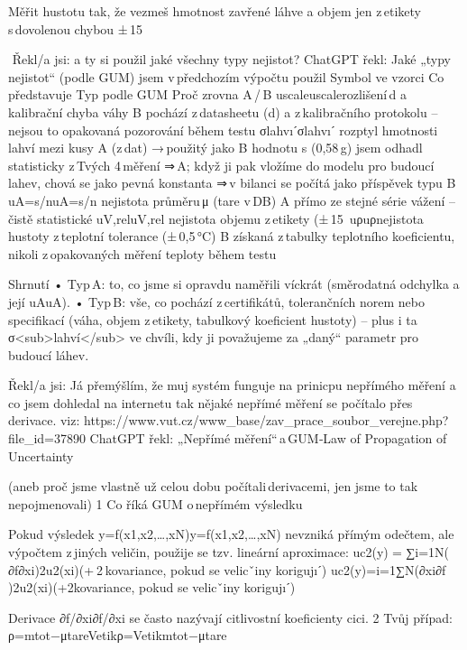 {Měřit hustotu tak, že vezmeš hmotnost zavřené láhve a objem jen z etikety s dovolenou chybou ± 15 %

​
Řekl/a jsi:
a ty si použil jaké všechny typy nejistot?
ChatGPT řekl:
Jaké „typy nejistot“ (podle GUM) jsem v předchozím výpočtu použil
Symbol ve vzorci	Co představuje	Typ podle GUM	Proč zrovna A / B
uscaleuscale​	rozlišení d a kalibrační chyba váhy	B	pochází z datasheetu (d) a z kalibračního protokolu – nejsou to opakovaná pozorování během testu
σlahvıˊσlahvıˊ​	rozptyl hmotnosti lahví mezi kusy	A (z dat) → použitý jako B	hodnotu s (0,58 g) jsem odhadl statisticky z Tvých 4 měření ⇒ A; když ji pak vložíme do modelu pro budoucí lahev, chová se jako pevná konstanta ⇒ v bilanci se počítá jako příspěvek typu B
uA=s/nuA​=s/n
​	nejistota průměru μ (tare v DB)	A	přímo ze stejné série vážení – čistě statistické
uV,reluV,rel​	nejistota objemu z etikety (± 15 %
uρuρ​	nejistota hustoty z teplotní tolerance (± 0,5 °C)	B	získaná z tabulky teplotního koeficientu, nikoli z opakovaných měření teploty během testu

    Shrnutí
    • Typ A: to, co jsme si opravdu naměřili víckrát (směrodatná odchylka a její uAuA​).
    • Typ B: vše, co pochází z certifikátů, tolerančních norem nebo specifikací (váha, objem z etikety, tabulkový koeficient hustoty) – plus i ta σ<sub>lahví</sub> ve chvíli, kdy ji považujeme za „daný“ parametr pro budoucí láhev.

Řekl/a jsi:
Já přemýšlím, že muj systém funguje na prinicpu nepřímého měření a co jsem dohledal na internetu tak nějaké nepřímé měření se počítalo přes derivace. viz: https://www.vut.cz/www_base/zav_prace_soubor_verejne.php?file_id=37890
ChatGPT řekl:
„Nepřímé měření“ a GUM‑Law of Propagation of Uncertainty

(aneb proč jsme vlastně už celou dobu počítali derivacemi, jen jsme to tak nepojmenovali)
1  Co říká GUM o nepřímém výsledku

Pokud výsledek y=f(x1,x2,…,xN)y=f(x1​,x2​,…,xN​) nevzniká přímým odečtem, ale výpočtem z jiných veličin, použije se tzv. lineární aproximace:
uc2(y)  =  ∑i=1N( ∂f∂xi)2u2(xi)(+ 2 kovariance, pokud se velicˇiny korigujıˊ)
uc2​(y)=i=1∑N​(∂xi​∂f​)2u2(xi​)(+2kovariance, pokud se velicˇiny korigujıˊ)

Derivace ∂f/∂xi∂f/∂xi​ se často nazývají citlivostní koeficienty cici​.
2  Tvůj případ: ρ=mtot−μtareVetikρ=Vetik​mtot​−μtare​​

}
